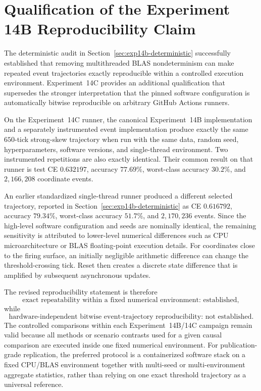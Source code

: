 \section{Qualification of the Experiment 14B Reproducibility Claim}
\label{sec:exp14b-repro-qualification}

The deterministic audit in Section~\ref{sec:exp14b-deterministic} successfully established that removing multithreaded BLAS nondeterminism can make repeated event trajectories exactly reproducible within a controlled execution environment. Experiment~14C provides an additional qualification that supersedes the stronger interpretation that the pinned software configuration is automatically bitwise reproducible on arbitrary GitHub Actions runners.

On the Experiment~14C runner, the canonical Experiment~14B implementation and a separately instrumented event implementation produce exactly the same $650$-tick strong-skew trajectory when run with the same data, random seed, hyperparameters, software versions, and single-thread environment. Two instrumented repetitions are also exactly identical. Their common result on that runner is test CE $0.632197$, accuracy $77.69\%$, worst-class accuracy $30.2\%$, and $2{,}166{,}208$ coordinate events.

An earlier standardized single-thread runner produced a different selected trajectory, reported in Section~\ref{sec:exp14b-deterministic} as CE $0.616792$, accuracy $79.34\%$, worst-class accuracy $51.7\%$, and $2{,}170{,}236$ events. Since the high-level software configuration and seeds are nominally identical, the remaining sensitivity is attributed to lower-level numerical differences such as CPU microarchitecture or BLAS floating-point execution details. For coordinates close to the firing surface, an initially negligible arithmetic difference can change the threshold-crossing tick. Reset then creates a discrete state difference that is amplified by subsequent asynchronous updates.

The revised reproducibility statement is therefore
\begin{equation}
\boxed{\text{exact repeatability within a fixed numerical environment: established}},
\end{equation}
while
\begin{equation}
\boxed{\text{hardware-independent bitwise event-trajectory reproducibility: not established}.}
\end{equation}
The controlled comparisons within each Experiment~14B/14C campaign remain valid because all methods or scenario contrasts used for a given causal comparison are executed inside one fixed numerical environment. For publication-grade replication, the preferred protocol is a containerized software stack on a fixed CPU/BLAS environment together with multi-seed or multi-environment aggregate statistics, rather than relying on one exact threshold trajectory as a universal reference.
